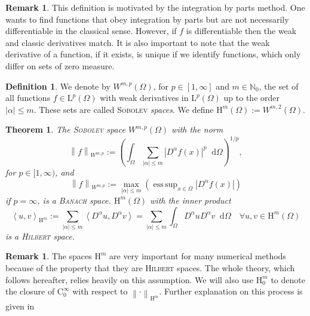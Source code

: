 \documentclass[12pt,a4paper,twoside, open=right]{scrreprt}
\theoremstyle{definition}
\newtheorem{rem}[auf]{Remark}
\newtheorem{defn}[auf]{Definition}
\theoremstyle{plain}
\newtheorem{sa}[auf]{Theorem}
\DeclareMathOperator*{\esssup}{ess\,sup} %
\newcommand{\abs}[1]{\left\vert #1\right\vert}
\newcommand{\dotp}[2]{\left\langle #1,#2\right\rangle}
\newcommand{\nn}{\mathbb{N}}
\newcommand{\norm}[1]{\left\lVert#1\right\rVert}
\newcommand{\D}{\mathop{}\!\mathrm{d}}
\begin{document}
\begin{rem}
    This definition is motivated by the integration by parts method. One wants to find functions that obey integration by parts but are not necessarily differentiable in the classical sense. However, if $f$ is differentiable then the weak and classic derivatives match. It is also important to note that the weak derivative of a function, if it exists, is unique if we identify functions, which only differ on sets of zero measure.
\end{rem}
\begin{defn}
    We denote by $W^{m,p}(\Omega)$, for $p\in[1,\infty]$ and $m\in\nn_0$, the set of all functions $f\in \mathrm{L}^p(\Omega)$ with weak derivatives in $\mathrm{L}^p(\Omega)$ up to the order $\abs{\alpha}\le m$. These sets are called \textsc{Sobolev} \emph{spaces}. We define $\mathrm{H}^m(\Omega):=W^{m,2}(\Omega)$.
\end{defn}
\begin{sa}
    The \textsc{Sobolev} space $W^{m,p}(\Omega)$ with the norm
    \begin{equation}
        \norm{f}_{W^{m,p}}:=\left(\int_\Omega\sum_{\abs{\alpha}\le m}\abs{D^{\alpha} f(x)}^p\D\Omega\right)^{1/p},
    \end{equation}
    for $p\in[1,\infty)$, and 
    \begin{equation}
        \norm{f}_{W^{m,p}}:=\max_{\abs{\alpha}\le m}\left(\esssup_{x\in\Omega}\abs{D^{\alpha}f(x)}\right)
    \end{equation}
    if $p=\infty$, is a \textsc{Banach} space. $\mathrm{H}^m(\Omega)$ with the inner product
    \begin{equation}
        \dotp{u}{v}_{\mathrm{H}^m}:=\sum_{\abs{\alpha}\le m}\dotp{D^{\alpha}u}{D^{\alpha}v}=\sum_{\abs{\alpha}\le m}\int_\Omega D^\alpha u D^\alpha v\D\Omega \quad \forall u,v\in \mathrm{H}^m(\Omega)
    \end{equation}
    is a \textsc{Hilbert} space.
\end{sa}
\begin{rem}
    The spaces $\mathrm{H}^m$ are very important for many numerical methods because of the property that they are \textsc{Hilbert} spaces. The whole theory, which follows hereafter, relies heavily on this assumption. We will also use $\mathrm{H}_0^m$ to denote the closure of $\mathrm{C}^\infty_0$ with respect to $\norm{\cdot}_{\mathrm{H}^m}$. Further explanation on this process is given in \cite{Jost2013}
\end{rem}
\end{document}
